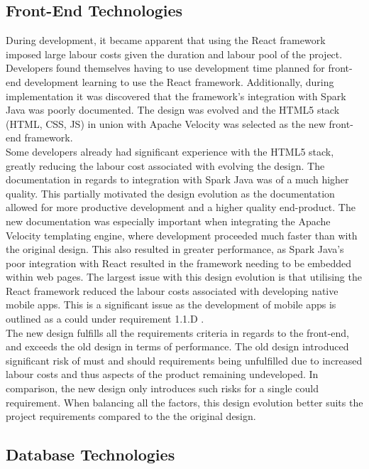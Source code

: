 \documentclass[9pt, titlepage]{extarticle}
\begin{document}
\subsection{Front-End Technologies}

During development, it became apparent that using the React framework \cite{web:react} imposed large labour costs given the duration and labour pool of the project. Developers found themselves having to use development time planned for front-end development learning to use the React framework. Additionally, during implementation it was discovered that the framework's integration with Spark Java \cite{web:spark} was poorly documented. The design was evolved and the HTML5 stack (HTML, CSS, JS) in union with Apache Velocity was selected as the new front-end framework.\\

Some developers already had significant experience with the HTML5 stack, greatly reducing the labour cost associated with evolving the design. The documentation in regards to integration with Spark Java was of a much higher quality. This partially motivated the design evolution as the documentation allowed for more productive development and a higher quality end-product. The new documentation was especially important when integrating the Apache Velocity templating engine, where development proceeded much faster than with the original design. This also resulted in greater performance, as Spark Java's poor integration with React resulted in the framework needing to be embedded within web pages. The largest issue with this design evolution is that utilising the React framework reduced the labour costs associated with developing native mobile apps. This is a significant issue as the development of mobile apps is outlined as a could under requirement 1.1.D \cite{requirements-analysis}.\\

The new design fulfills all the requirements criteria in regards to the front-end, and exceeds the old design in terms of performance. The old design introduced significant risk of must and should requirements being unfulfilled due to increased labour costs and thus aspects of the product remaining undeveloped. In comparison, the new design only introduces such risks for a single could requirement. When balancing all the factors, this design evolution better suits the project requirements compared to the the original design.

\subsection{Database Technologies}
\end{document}
